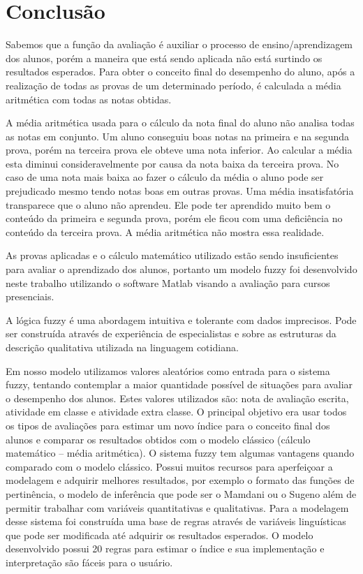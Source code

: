 \documentclass{article}
\begin{document}
\section{Conclusão}
Sabemos que a função da avaliação é auxiliar o processo de
ensino/aprendizagem dos alunos, porém a maneira que está sendo
aplicada não está surtindo os resultados esperados. Para obter
o conceito final do desempenho do aluno, após a realização
de todas as provas de um determinado período, é calculada a
média aritmética com todas as notas obtidas.

A média aritmética usada para o cálculo da nota final
do aluno não analisa todas as notas em conjunto. Um aluno
conseguiu boas notas na primeira e na segunda prova, porém
na terceira prova ele obteve uma nota inferior. Ao calcular
a média esta diminui consideravelmente por causa da nota
baixa da terceira prova. No caso de uma nota mais baixa ao
fazer o cálculo da média o aluno pode ser prejudicado mesmo
tendo notas boas em outras provas. Uma média insatisfatória
transparece que o aluno não aprendeu. Ele pode ter aprendido
muito bem o conteúdo da primeira e segunda prova, porém ele
ficou com uma deficiência no conteúdo da terceira prova. A
média aritmética não mostra essa realidade.


As provas aplicadas e o cálculo matemático utilizado estão
sendo insuficientes para avaliar o aprendizado dos alunos,
portanto um modelo fuzzy foi desenvolvido neste trabalho
utilizando o software Matlab visando a avaliação para cursos
presenciais.


A lógica fuzzy é uma abordagem intuitiva e tolerante com dados
imprecisos. Pode ser construída através de experiência de
especialistas e sobre as estruturas da descrição qualitativa
utilizada na linguagem cotidiana.

Em nosso modelo utilizamos valores aleatórios como entrada
para o sistema fuzzy, tentando contemplar a maior quantidade
possível de situações para avaliar o desempenho dos alunos.
Estes valores utilizados são: nota de avaliação escrita,
atividade em classe e atividade extra classe. O principal
objetivo era usar todos os tipos de avaliações para estimar
um novo índice para o conceito final dos alunos e comparar os
resultados obtidos com o modelo clássico (cálculo matemático
– média aritmética). O sistema fuzzy tem algumas vantagens
quando comparado com o modelo clássico. Possui muitos recursos
para aperfeiçoar a modelagem e adquirir melhores resultados,
por exemplo o formato das funções de pertinência, o modelo de
inferência que pode ser o Mamdani ou o Sugeno além de permitir
trabalhar com variáveis quantitativas e qualitativas. Para
a modelagem desse sistema foi construída uma base de regras
através de variáveis linguísticas que pode ser modificada
até adquirir os resultados esperados. O modelo desenvolvido
possui 20 regras para estimar o índice e sua implementação e
interpretação são fáceis para o usuário.
\end{document}
